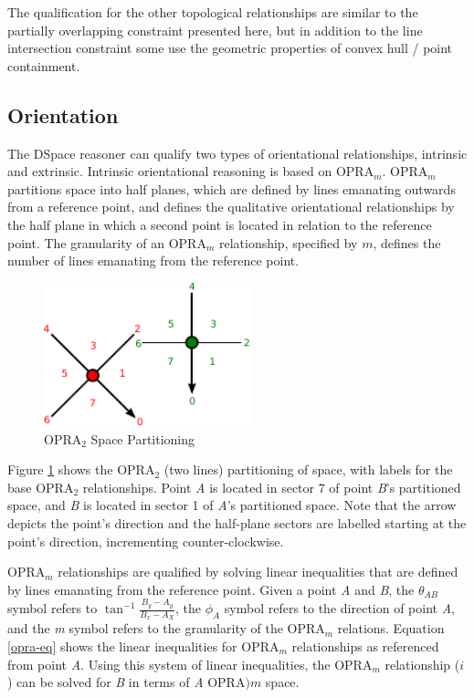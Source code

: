\documentclass[12pt]{ucthesis}
\begin{document}
The qualification for the other topological relationships are similar to the partially overlapping constraint presented here, but in addition to the line intersection constraint some use the geometric properties of convex hull / point containment.

\subsection{Orientation} \label{orientation}
The DSpace reasoner can qualify two types of orientational relationships, intrinsic and extrinsic. Intrinsic orientational reasoning is based on OPRA$_{m}$. OPRA$_{m}$ partitions space into half planes, which are defined by lines emanating outwards from a reference point, and defines the qualitative orientational relationships by the half plane in which a second point is located in relation to the reference point. The granularity of an OPRA$_{m}$ relationship, specified by $m$, defines the number of lines emanating from the reference point. 

\begin{figure}[b]
\centering
\includegraphics[width=60mm]{facing-opra-base-rel}
\caption{OPRA$_{2}$ Space Partitioning}
\label{facing-opra-base-rel}
\end{figure}

Figure \ref{facing-opra-base-rel} shows the OPRA$_{2}$ (two lines) partitioning of space, with labels for the base OPRA$_{2}$ relationships. Point \emph{A} is located in sector 7 of point \emph{B}'s partitioned space, and \emph{B} is located in sector 1 of \emph{A}'s partitioned space. Note that the arrow depicts the point's direction and the half-plane sectors are labelled starting at the point's direction, incrementing counter-clockwise. 

OPRA$_{m}$ relationships are qualified by solving linear inequalities that are defined by lines emanating from the reference point. Given a point \emph{A} and \emph{B}, the $\theta_{AB}$ symbol refers to $ \tan^{-1} \frac{B_{y} - A_{y}}{B_{x} - A_{X}} $, the $\phi_{A}$ symbol refers to the direction of point \emph{A}, and the \emph{m} symbol refers to the granularity of the OPRA$_{m}$ relations. Equation \ref{opra-eq} shows the linear inequalities for OPRA$_{m}$ relationships as referenced from point \emph{A}. Using this system of linear inequalities, the OPRA$_{m}$ relationship ($i$) can be solved for \emph{B} in terms of \emph{A} OPRA$){m}$ space.
\end{document}

